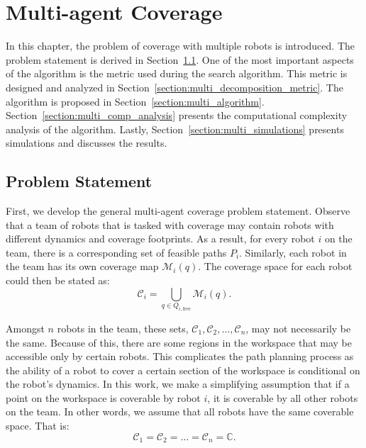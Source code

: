 \documentclass[../main.tex]{subfiles}
\begin{document}
\chapter{Multi-agent Coverage}
\label{chapter:multi_agent_coverage}

In this chapter, the problem of coverage with multiple robots is introduced. The problem statement is derived in Section~\ref{section:multi_agent_problem_statement}. One of the most important aspects of the algorithm is the metric used during the search algorithm. This metric is designed and analyzed in Section~\ref{section:multi_decomposition_metric}. The algorithm is proposed in Section~\ref{section:multi_algorithm}. Section~\ref{section:multi_comp_analysis} presents the computational complexity analysis of the algorithm. Lastly, Section~\ref{section:multi_simulations} presents simulations and discusses the results.


\section{Problem Statement}
\label{section:multi_agent_problem_statement}

First, we develop the general multi-agent coverage problem statement. Observe that a team of robots that is tasked with coverage may contain robots with different dynamics and coverage footprints. As a result, for every robot $i$ on the team, there is a corresponding set of feasible paths $P_i$. Similarly, each robot in the team has its own coverage map $\mathcal{M}_i(q)$. The coverage space for each robot could then be stated as:
\begin{equation}
	\mathcal{C}_i=\bigcup_{q\in Q_{i,\text{free}}}\mathcal{M}_i(q).
\end{equation}

Amongst $n$ robots in the team, these sets, $\mathcal{C}_1, \mathcal{C}_2,\ldots,\mathcal{C}_n$, may not necessarily be the same. Because of this, there are some regions in the workspace that may be accessible only by certain robots. This complicates the path planning process as the ability of a robot to cover a certain section of the workspace is conditional on the robot's dynamics. In this work, we make a simplifying assumption that if a point on the workspace is coverable by robot $i$, it is coverable by all other robots on the team. In other words, we assume that all robots have the same coverable space. That is:
\begin{equation}
	\mathcal{C}_1=\mathcal{C}_2=\ldots=\mathcal{C}_n=\mathbb{C}.
\end{equation}
\end{document}
